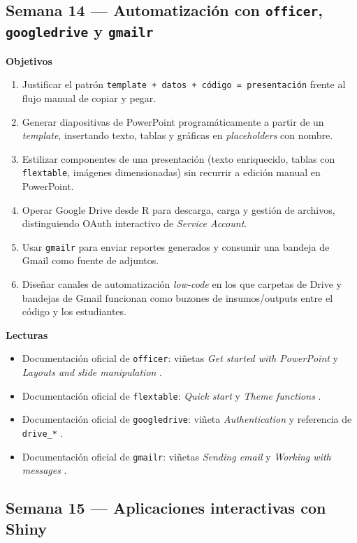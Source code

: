 \documentclass[11pt,letterpaper]{article}
\newcommand{\semanaSucinta}[2]{%
  \subsection*{\color{main}Semana #1 --- #2}%
}
\begin{document}
\semanaSucinta{14}{Automatización con \texttt{officer}, \texttt{googledrive} y \texttt{gmailr}}

\noindent\textbf{Objetivos}
\begin{enumerate}[leftmargin=*, itemsep=1pt]
    \item Justificar el patrón \texttt{template + datos + código = presentación} frente al flujo manual de copiar y pegar.
    \item Generar diapositivas de PowerPoint programáticamente a partir de un \textit{template}, insertando texto, tablas y gráficas en \textit{placeholders} con nombre.
    \item Estilizar componentes de una presentación (texto enriquecido, tablas con \texttt{flextable}, imágenes dimensionadas) sin recurrir a edición manual en PowerPoint.
    \item Operar Google Drive desde R para descarga, carga y gestión de archivos, distinguiendo OAuth interactivo de \textit{Service Account}.
    \item Usar \texttt{gmailr} para enviar reportes generados y consumir una bandeja de Gmail como fuente de adjuntos.
    \item Diseñar canales de automatización \textit{low-code} en los que carpetas de Drive y bandejas de Gmail funcionan como buzones de insumos/outputs entre el código y los estudiantes.
\end{enumerate}

\noindent\textbf{Lecturas}
\begin{itemize}[leftmargin=*, itemsep=1pt]
    \item Documentación oficial de \texttt{officer}: viñetas \textit{Get started with PowerPoint} y \textit{Layouts and slide manipulation} \cite{gohel-officer}.
    \item Documentación oficial de \texttt{flextable}: \textit{Quick start} y \textit{Theme functions} \cite{gohel-flextable}.
    \item Documentación oficial de \texttt{googledrive}: viñeta \textit{Authentication} y referencia de \texttt{drive\_*} \cite{bryan-googledrive}.
    \item Documentación oficial de \texttt{gmailr}: viñetas \textit{Sending email} y \textit{Working with messages} \cite{hester-gmailr}.
\end{itemize}

\semanaSucinta{15}{Aplicaciones interactivas con Shiny}
\end{document}
